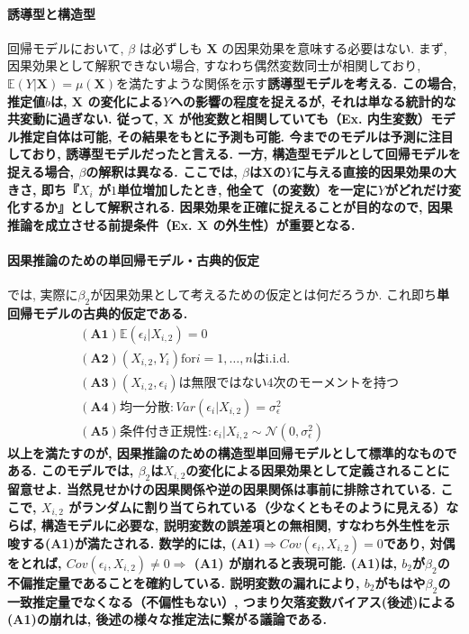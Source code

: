 \documentclass[paper=a4paper,fontsize=10pt]{jlreq}
\begin{document}
\paragraph{誘導型と構造型}
回帰モデルにおいて, $\beta$ は必ずしも $\mathbf{X}$ の因果効果を意味する必要はない. まず, 因果効果として解釈できない場合, すなわち偶然変数同士が相関しており, $\mathbb{E}(Y|\mathbf{X})=\mu(\mathbf{X})$を満たすような関係を示す\rmfamily\mcfamily\bfseries{誘導型モデル}\mdseries を考える. この場合, 推定値$b$は, $\mathbf{X}$ の変化による$Y$への影響の程度を捉えるが, それは単なる統計的な共変動に過ぎない. 従って, $\mathbf{X}$ が他変数と相関していても（Ex. 内生変数）\rmfamily\mcfamily\bfseries{モデル推定自体は可能}\mdseries , その結果をもとに\rmfamily\mcfamily\bfseries{予測も可能}\mdseries . 今までのモデルは予測に注目しており, 誘導型モデルだったと言える. 一方, \rmfamily\mcfamily\bfseries{構造型モデル}\mdseries として回帰モデルを捉える場合, $\beta$の解釈は異なる. ここでは, $\beta$は$\mathbf{X}$の$Y$に与える\rmfamily\mcfamily\bfseries{直接的因果効果}\mdseries の大きさ, 即ち『$X_{i}$ が$1$単位増加したとき, 他全て（の変数）を一定に$Y$がどれだけ変化するか』として解釈される. 因果効果を正確に捉えることが目的なので, 因果推論を成立させる前提条件（Ex. $\mathbf{X}$ の外生性）が重要となる.\\

\paragraph{因果推論のための単回帰モデル・古典的仮定}
では, 実際に$\beta_2$が因果効果として考えるための仮定とは何だろうか. これ即ち\rmfamily\mcfamily\bfseries{単回帰モデルの古典的仮定}\mdseries である. 
\begin{align*}
  &\mathbf{(A1)}　 \mathbb{E}(\epsilon_i|X_{i, 2})=0\\
  &\mathbf{(A2)}　 (X_{i, 2}, Y_{i})　\text{for}　i=1, \dots, n　\text{はi.i.d.}\\
  &\mathbf{(A3)}　 (X_{i, 2}, \epsilon_{i})\text{は無限ではない4次のモーメントを持つ}\\
  &\mathbf{(A4)}　 \text{均一分散}: Var(\epsilon_i|X_{i, 2})=\sigma_\epsilon^{2}\\
  &\mathbf{(A5)}　 条件付き正規性: \epsilon_i|X_{i, 2} \sim \mathcal{N} (0, \sigma_\epsilon^{2})
\end{align*}
以上を満たすのが, 因果推論のための構造型単回帰モデルとして標準的なものである. このモデルでは, $\beta_2$は$X_{i,2}$の変化による\rmfamily\mcfamily\bfseries{因果効果}\mdseries として定義されることに留意せよ. 当然見せかけの因果関係や逆の因果関係は事前に排除されている. ここで, $X_{i,2}$ がランダムに割り当てられている（少なくともそのように見える）ならば, 構造モデルに必要な, 説明変数の誤差項との無相関, すなわち\textbf{外生性}を示唆する\rmfamily\mcfamily\bfseries{(A1)}\mdseries が満たされる. 数学的には, (A1)$\Rightarrow Cov(\epsilon_i, X_{i, 2})=0$であり, 対偶をとれば, $Cov(\epsilon_i, X_{i, 2})\neq 0\Rightarrow$ (A1) が崩れると表現可能. (A1)は, $b_2$が$\beta_2$の不偏推定量であることを確約している. 説明変数の漏れにより, $b_2$がもはや$\beta_2$の一致推定量でなくなる（不偏性もない）, つまり\rmfamily\mcfamily\bfseries{欠落変数バイアス}\mdseries (後述)による(A1)の崩れは, 後述の様々な推定法に繋がる議論である.\\
\end{document}
